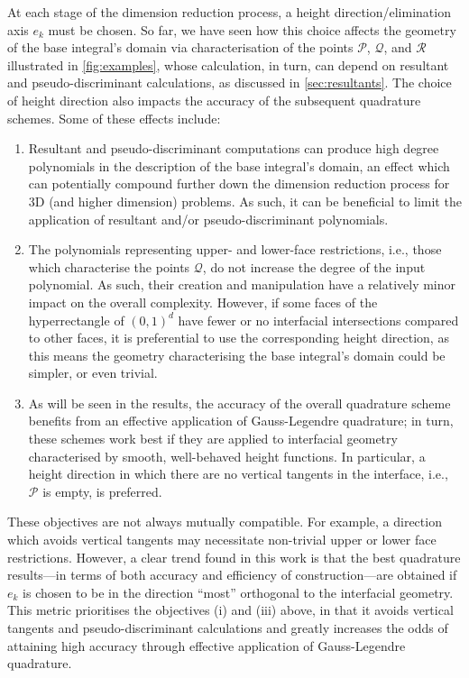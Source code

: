 \documentclass[onefignum,onetabnum,onealgnum,oneeqnum]{siamart190516}
\begin{document}
At each stage of the dimension reduction process, a height direction/elimination axis $e_k$ must be chosen. So far, we have seen how this choice affects the geometry of the base integral's domain via characterisation of the points $\mathcal P$, $\mathcal Q$, and $\mathcal R$ illustrated in \cref{fig:examples}, whose calculation, in turn, can depend on resultant and pseudo-discriminant calculations, as discussed in \cref{sec:resultants}. The choice of height direction also impacts the accuracy of the subsequent quadrature schemes. Some of these effects include:
\begin{enumerate}[label=(\roman*)]
%
\item Resultant and pseudo-discriminant computations can produce high degree polynomials in the description of the base integral's domain, an effect which can potentially compound further down the dimension reduction process for 3D (and higher dimension) problems. As such, it can be beneficial to limit the application of resultant and/or pseudo-discriminant polynomials.
\item The polynomials representing upper- and lower-face restrictions, i.e., those which characterise the points $\mathcal Q$, do not increase the degree of the input polynomial. As such, their creation and manipulation have a relatively minor impact on the overall complexity. However, if some faces of the hyperrectangle of $(0,1)^d$ have fewer or no interfacial intersections compared to other faces, it is preferential to use the corresponding height direction, as this means the geometry characterising the base integral's domain could be simpler, or even trivial.
\item As will be seen in the results, the accuracy of the overall quadrature scheme benefits from an effective application of Gauss-Legendre quadrature; in turn, these schemes work best if they are applied to interfacial geometry characterised by smooth, well-behaved height functions. In particular, a height direction in which there are no vertical tangents in the interface, i.e., $\mathcal P$ is empty, is preferred.
\end{enumerate}
These objectives are not always mutually compatible. For example, a direction which avoids vertical tangents may necessitate non-trivial upper or lower face restrictions. However, a clear trend found in this work is that the best quadrature results---in terms of both accuracy and efficiency of construction---are obtained if $e_k$ is chosen to be in the direction ``most'' orthogonal to the interfacial geometry. This metric prioritises the objectives (i) and (iii) above, in that it avoids vertical tangents and pseudo-discriminant calculations and greatly increases the odds of attaining high accuracy through effective application of Gauss-Legendre quadrature.
\end{document}
